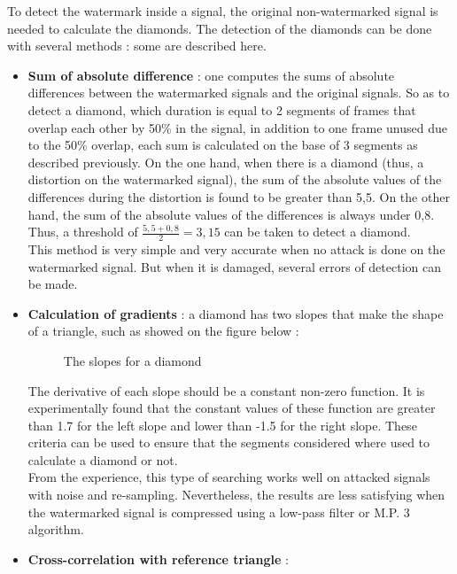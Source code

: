 To detect the watermark inside a signal, the original non-watermarked signal is needed to calculate the diamonds. The detection of the diamonds can be done with several methods : some are described here.\\
\begin{itemize}
\item \textbf{Sum of absolute difference} : one computes the sums of absolute differences between the watermarked signals and the original signals. So as to detect a diamond, which duration is equal to 2 segments of frames that overlap each other by 50\% in the signal, in addition to one frame unused due to the 50\% overlap, each sum is calculated on the base of 3 segments as described previously. On the one hand, when there is a diamond (thus, a distortion on the watermarked signal), the sum of the absolute values of the differences during the distortion is found to be greater than 5,5. On the other hand, the sum of the absolute values of the differences is always under 0,8. Thus, a threshold of $\frac{5,5 + 0,8}{2} = 3,15$ can be taken to detect a diamond.\\
This method is very simple and very accurate when no attack is done on the watermarked signal. But when it is damaged, several errors of detection can be made.
\item \textbf{Calculation of gradients} : a diamond has two slopes that make the shape of a triangle, such as showed on the figure below :
\begin{figure}[H]
\caption{\label{slopes} The slopes for a diamond}
\end{figure}
The derivative of each slope should be a constant non-zero function. It is experimentally found that the constant values of these function are greater than 1.7 for the left slope and lower than -1.5 for the right slope. These criteria can be used to ensure that the segments considered where used to calculate a diamond or not.\\
From the experience, this type of searching works well on attacked signals with noise and re-sampling. Nevertheless, the results are less satisfying when the watermarked signal is compressed using a low-pass filter or M.P. 3 algorithm.
\item \textbf{Cross-correlation with reference triangle} : 
\end{itemize}